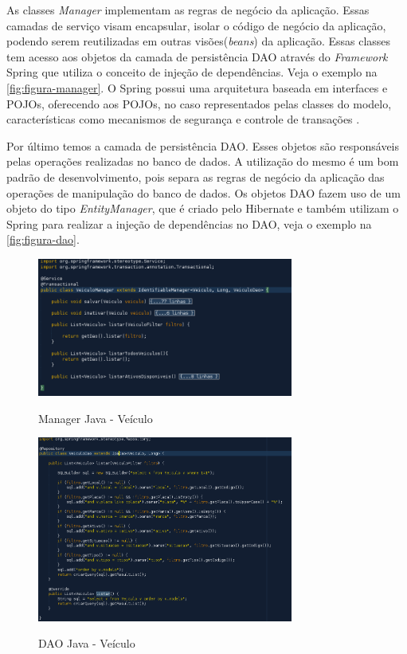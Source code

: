 As classes \textit{Manager} implementam as regras de negócio da aplicação. Essas camadas de serviço visam encapsular, isolar o código de negócio da aplicação, podendo serem reutilizadas em outras visões(\textit{beans}) da aplicação. Essas classes tem acesso aos objetos da camada de persistência DAO através do \textit{Framework} Spring que utiliza o conceito de injeção de dependências. Veja o exemplo na \autoref{fig:figura-manager}. 
O Spring possui uma arquitetura baseada em interfaces e POJOs, oferecendo aos POJOs, no caso representados pelas classes do modelo, características como mecanismos de segurança e controle de transações \cite{WikipediaSpring2017}. 

Por último temos a camada de persistência DAO. Esses objetos são responsáveis pelas operações realizadas no banco de dados. A utilização do mesmo é um bom padrão de desenvolvimento, pois separa as regras de negócio da aplicação das operações de manipulação do banco de dados. Os objetos DAO fazem uso de um objeto do tipo \textit{EntityManager}, que é criado pelo Hibernate e também utilizam o Spring para realizar a injeção de dependências no DAO, veja o exemplo na \autoref{fig:figura-dao}. 

\begin{figure}[!htb]
    \centering
    \caption{Manager Java - Veículo}
    \includegraphics[width=0.75\textwidth]{dados/figuras/manager.png}
    \label{fig:figura-manager}
\end{figure}

\begin{figure}[!htb]
    \centering
    \caption{DAO Java - Veículo}
    \includegraphics[width=0.75\textwidth]{dados/figuras/dao.png}
    \label{fig:figura-dao}
\end{figure}


